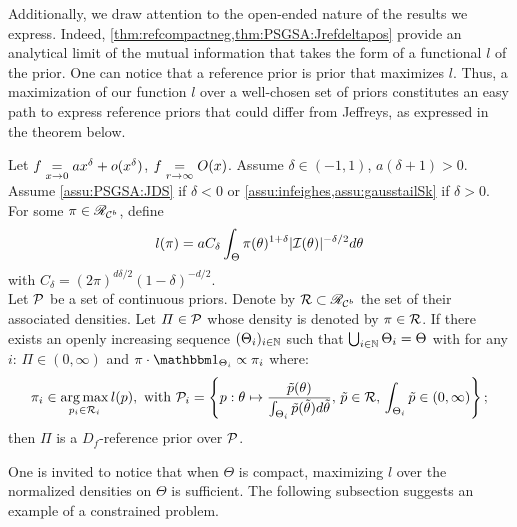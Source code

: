 Additionally, we draw attention to the open-ended nature of the results we express. 
Indeed, \cref{thm:refcompactneg,thm:PSGSA:Jrefdeltapos} provide an analytical limit of the mutual information that takes the form of a functional $l$ of the prior.
One can notice that a reference prior is prior that maximizes $l$.
Thus, a maximization of our function $l$ over a well-chosen set of priors constitutes an easy path to express reference priors that could differ from Jeffreys, as expressed in the theorem below.
\begin{thm}\label{thm:PSGSA:maximizel}
    Let $f\overset{}{\underset{x\rightarrow 0}{=}} a x^\delta+o(x^\delta)$, $f\overset{}{\underset{r\rightarrow\infty}{=}}O(x)$. Assume $\delta\in(-1,1)$, $a(\delta+1)>0$. Assume \cref{assu:PSGSA:JDS} if $\delta<0$ or \cref{assu:infeighes,assu:gausstailSk} if $\delta>0$.
    For some $\pi\in\mathscr{R}_{\mathcal{C}^b}$, define
        \begin{equation}
            l(\pi) = aC_\delta\int_\Theta\pi(\theta)^{1+\delta}|\mathcal{I}(\theta)|^{-\delta/2}d\theta
        \end{equation}
    with $C_\delta=(2\pi)^{d\delta/2}(1-\delta)^{-d/2} $. \\
    Let $\mathcal{P}$ be a set of continuous priors. %
    Denote by $\mathcal{R}\subset\mathscr{R}_{\mathcal{C}^b}$ the set of their associated densities.
    Let $\varPi\in\mathcal{P}$ whose density is denoted by $\pi\in\mathcal{R}$.
    If there exists an openly increasing sequence $(\Theta_i)_{i\in\mathbb{N}}$ such that $\bigcup_{i\in\mathbb{N}}\Theta_i=\Theta$ with for any $i$: $\varPi\in(0,\infty)$ and $\pi\cdot\indic_{\Theta_i}\propto\pi_i$ where:
        \begin{equation}
            \pi_i\in \operatorname*{arg\,max}_{p_i\in\mathcal{R}_i} l(p) ,\text{\ with\ }\mathcal{P}_i=\left\{p:\theta\mapsto\frac{\tilde p(\theta)}{\int_{\Theta_i}\tilde p(\tilde\theta)d\tilde\theta },\,   \tilde p\in\mathcal{R},\, \int_{\Theta_i}\tilde p\in(0,\infty)    \right\};
        \end{equation}
    then $\varPi$ is a $D_f$-reference prior over $\mathcal{P}$.
\end{thm}

One is invited to notice that when $\Theta$ is compact, maximizing $l$ over the normalized densities on $\Theta$ is sufficient.
The following subsection suggests an example of a constrained problem.


    
